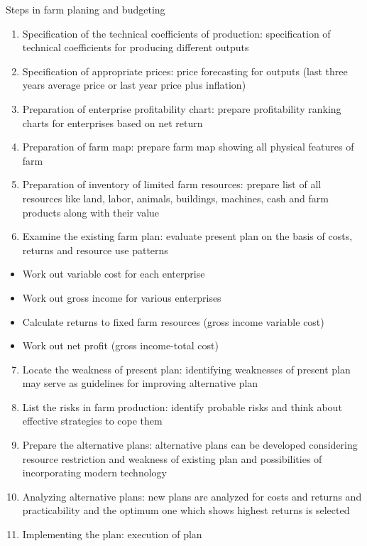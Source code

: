 \documentclass[12pt,ignorenonframetext,aspectratio=169]{beamer}
\providecommand{\tightlist}{%
  \setlength{\itemsep}{0pt}\setlength{\parskip}{0pt}}
\begin{document}
\begin{frame}{Steps in farm planing and budgeting}
\protect\hypertarget{steps-in-farm-planing-and-budgeting}{}
\footnotesize

\begin{enumerate}
\tightlist
\item
  Specification of the technical coefficients of production:
  specification of technical coefficients for producing different
  outputs
\item
  Specification of appropriate prices: price forecasting for outputs
  (last three years average price or last year price plus inflation)
\item
  Preparation of enterprise profitability chart: prepare profitability
  ranking charts for enterprises based on net return
\item
  Preparation of farm map: prepare farm map showing all physical
  features of farm
\item
  Preparation of inventory of limited farm resources: prepare list of
  all resources like land, labor, animals, buildings, machines, cash and
  farm products along with their value
\item
  Examine the existing farm plan: evaluate present plan on the basis of
  costs, returns and resource use patterns
\end{enumerate}

\begin{itemize}
\tightlist
\item
  Work out variable cost for each enterprise
\item
  Work out gross income for various enterprises
\item
  Calculate returns to fixed farm resources (gross income variable cost)
\item
  Work out net profit (gross income-total cost)
\end{itemize}
\end{frame}

\begin{frame}{}
\protect\hypertarget{section-2}{}
\begin{enumerate}
\setcounter{enumi}{6}
\tightlist
\item
  Locate the weakness of present plan: identifying weaknesses of present
  plan may serve as guidelines for improving alternative plan
\item
  List the risks in farm production: identify probable risks and think
  about effective strategies to cope them
\item
  Prepare the alternative plans: alternative plans can be developed
  considering resource restriction and weakness of existing plan and
  possibilities of incorporating modern technology
\item
  Analyzing alternative plans: new plans are analyzed for costs and
  returns and practicability and the optimum one which shows highest
  returns is selected
\item
  Implementing the plan: execution of plan
\end{enumerate}
\end{frame}
\end{document}

